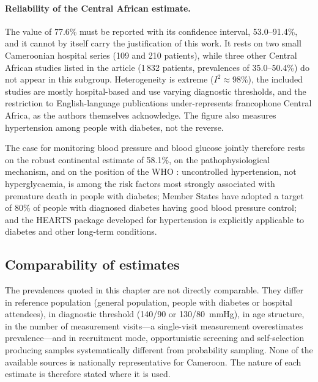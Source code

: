\documentclass[12pt,a4paper,oneside]{report}
\begin{document}
\paragraph{Reliability of the Central African estimate.}\label{sec:central-estimates} The value of 77.6\% must be reported with its confidence interval, 53.0--91.4\%, and it cannot by itself carry the justification of this work. It rests on two small Cameroonian hospital series (109 and 210 patients), while three other Central African studies listed in the article (1\,832 patients, prevalences of 35.0--50.4\%) do not appear in this subgroup. Heterogeneity is extreme ($I^2 \approx 98\%$), the included studies are mostly hospital-based and use varying diagnostic thresholds, and the restriction to English-language publications under-represents francophone Central Africa, as the authors themselves acknowledge. The figure also measures hypertension among people with diabetes, not the reverse.

The case for monitoring blood pressure and blood glucose jointly therefore rests on the robust continental estimate of 58.1\%, on the pathophysiological mechanism, and on the position of the WHO \parencite{who2023hypertension}: uncontrolled hypertension, not hyperglycaemia, is among the risk factors most strongly associated with premature death in people with diabetes; Member States have adopted a target of 80\% of people with diagnosed diabetes having good blood pressure control; and the HEARTS package developed for hypertension is explicitly applicable to diabetes and other long-term conditions.

\subsection{Comparability of estimates}\label{sec:comparability}

The prevalences quoted in this chapter are not directly comparable. They differ in reference population (general population, people with diabetes or hospital attendees), in diagnostic threshold (140/90 or 130/80~mmHg), in age structure, in the number of measurement visits---a single-visit measurement overestimates prevalence---and in recruitment mode, opportunistic screening and self-selection producing samples systematically different from probability sampling. None of the available sources is nationally representative for Cameroon. The nature of each estimate is therefore stated where it is used.

\end{document}
